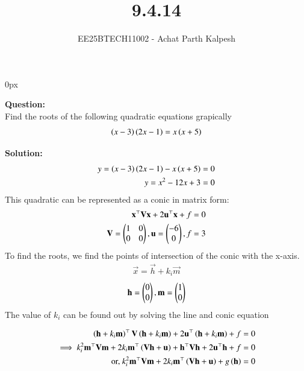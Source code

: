\documentclass[journal]{IEEEtran}
\begin{document}

\title{9.4.14}
\author{EE25BTECH11002 - Achat Parth Kalpesh }
{\let\newpage\relax\maketitle}
\renewcommand{\thefigure}{\theenumi}
\renewcommand{\thetable}{\theenumi}
\setlength{\intextsep}{10pt} %
\renewcommand{\thetable}{\theenumi}
\parindent 0px



\textbf{Question:}\\
Find the roots of the following quadratic equations grapically
\begin{align}
    \left(x-3\right)\left(2x-1\right)=x\left(x+5\right)
\end{align}

\textbf{Solution:}\\
\begin{align}
    y = \left(x-3\right)\left(2x-1\right)-x\left(x+5\right) = 0\\
    y = x^2 - 12x + 3 = 0
\end{align}
This quadratic can be represented as a conic in matrix form:
\begin{align}
   \mathbf{x}^{\top}\mathbf{V}\mathbf{x} + 2\mathbf{u}^{\top}\mathbf{x} + f = 0\\ 
   \mathbf{V} = \begin{pmatrix}1 & 0 \\ 0 & 0\end{pmatrix} , \mathbf{u} = \begin{pmatrix}-6 \\0\end{pmatrix} ,
   f = 3
\end{align}
To find the roots, we find the points of intersection of the conic with the x-axis.
\begin{align}
\vec{x} = \vec{h} + k_i\vec{m}    
\end{align}
\begin{align}
\mathbf{h}=\begin{pmatrix}0 \\ 0\end{pmatrix}, \mathbf{m} = \begin{pmatrix}1 \\ 0\end{pmatrix}
\end{align}
The value of $k_i$ can be found out by solving the line and conic equation

\begin{align}
\left(\mathbf{h} + k_i \mathbf{m}\right)^{\top} \mathbf{V} \left(\mathbf{h} + k_i \mathbf{m}\right) + 2\mathbf{u}^{\top} \left(\mathbf{h} + k_i \mathbf{m}\right) + f &= 0 \\
\implies k_i^{2} \mathbf{m}^{\top}\mathbf{V}\mathbf{m} + 2k_i \mathbf{m}^{\top} \left(\mathbf{V}\mathbf{h} + \mathbf{u}\right) + \mathbf{h}^{\top}\mathbf{V}\mathbf{h} + 2\mathbf{u}^{\top}\mathbf{h} + f &= 0 \\
\text{or, } k_i^{2} \mathbf{m}^{\top}\mathbf{V}\mathbf{m} + 2k_i \mathbf{m}^{\top} \left(\mathbf{V}\mathbf{h} + \mathbf{u}\right) + g\left(\mathbf{h}\right) &= 0
\end{align}
\end{document}
